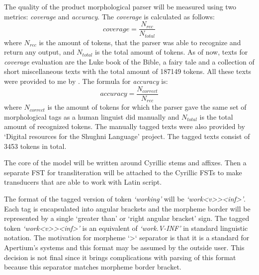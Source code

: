 \par The quality of the product morphological parser will be measured using two metrics: \textit{coverage} and \textit{accuracy}. The \textit{coverage} is calculated as follows: \[coverage = \frac{N_{rec}}{N_{total}}\] where $N_{rec}$ is the amount of tokens, that the parser was able to recognize and return any output, and $N_{total}$ is the total amount of tokens. As of now, texts for \textit{coverage} evaluation are the Luke book of the Bible, a fairy tale and a collection of short miscellaneous texts with the total amount of 187149 tokens. All these texts were provided to me by \textcite{makarov_digital_2022}. The formula for \textit{accuracy} is: \[accuracy = \frac{N_{correct}}{N_{rec}}\] where $N_{correct}$ is the amount of tokens for which the parser gave the same set of morphological tags as a human linguist did manually and $N_{total}$ is the total amount of recognized tokens. The manually tagged texts were also provided by `Digital resources for the Shughni Language' project. The tagged texts consist of 3453 tokens in total.
\par The core of the model will be written around Cyrillic stems and affixes. Then a separate FST for transliteration will be attached to the Cyrillic FSTs to make transducers that are able to work with Latin script.
\par The format of the tagged version of token \textit{`working'} will be \textit{`work<v>{}><inf>'}. Each tag is encapsulated into angular brackets and the morpheme border will be represented by a single `greater than' or `right angular bracket' sign. The tagged token \textit{`work<v>{}><inf>'} is an equivalent of \textit{`work.V-INF'} in standard linguistic notation. The motivation for morpheme `>` separator is that it is a standard for Apertium's systems and this format may be assumed by the outside user. This decision is not final since it brings complications with parsing of this format because this separator matches morpheme border bracket.